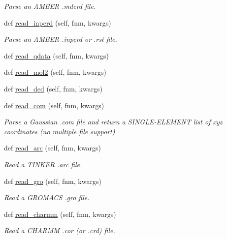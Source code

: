 \begin{DoxyCompactItemize}
\begin{DoxyCompactList}\small\item\em Parse an A\+M\+B\+ER .mdcrd file. \end{DoxyCompactList}\item 
def \hyperlink{classsrc_1_1molecule_1_1Molecule_a25e54248bd35147e2c2aa210d06a58a5}{read\+\_\+inpcrd} (self, fnm, kwargs)
\begin{DoxyCompactList}\small\item\em Parse an A\+M\+B\+ER .inpcrd or .rst file. \end{DoxyCompactList}\item 
def \hyperlink{classsrc_1_1molecule_1_1Molecule_a6c78338a640dbf1fd95c38f980203643}{read\+\_\+qdata} (self, fnm, kwargs)
\item 
def \hyperlink{classsrc_1_1molecule_1_1Molecule_a1d771e111c1cc4c8a0783b58081e282d}{read\+\_\+mol2} (self, fnm, kwargs)
\item 
def \hyperlink{classsrc_1_1molecule_1_1Molecule_a258bc7b495910f9ff3bb552413207ecd}{read\+\_\+dcd} (self, fnm, kwargs)
\item 
def \hyperlink{classsrc_1_1molecule_1_1Molecule_a742c96f62c86d00ac97bb5004f8ebd92}{read\+\_\+com} (self, fnm, kwargs)
\begin{DoxyCompactList}\small\item\em Parse a Gaussian .com file and return a S\+I\+N\+G\+L\+E-\/\+E\+L\+E\+M\+E\+NT list of xyz coordinates (no multiple file support) \end{DoxyCompactList}\item 
def \hyperlink{classsrc_1_1molecule_1_1Molecule_a7e4057a5d9f4bb4a62cef21680f91327}{read\+\_\+arc} (self, fnm, kwargs)
\begin{DoxyCompactList}\small\item\em Read a T\+I\+N\+K\+ER .arc file. \end{DoxyCompactList}\item 
def \hyperlink{classsrc_1_1molecule_1_1Molecule_a4ce0cfbb42e84ec2fe5d8097d0ff5fda}{read\+\_\+gro} (self, fnm, kwargs)
\begin{DoxyCompactList}\small\item\em Read a G\+R\+O\+M\+A\+CS .gro file. \end{DoxyCompactList}\item 
def \hyperlink{classsrc_1_1molecule_1_1Molecule_a3710f2055a57158a9b5fbab2c5943683}{read\+\_\+charmm} (self, fnm, kwargs)
\begin{DoxyCompactList}\small\item\em Read a C\+H\+A\+R\+MM .cor (or .crd) file. \end{DoxyCompactList}\item 

\end{DoxyCompactItemize}
